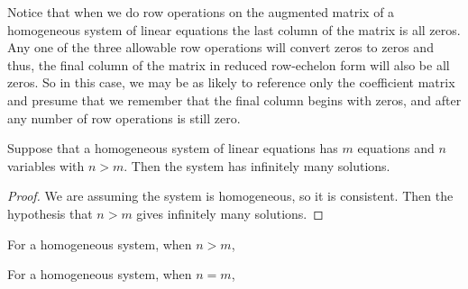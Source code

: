 \documentclass{ximera}
\begin{document}
Notice that when we do row operations on the augmented matrix of a
homogeneous system of linear equations the last column of the matrix
is all zeros.  Any one of the three allowable row operations will
convert zeros to zeros and thus, the final column of the matrix in
reduced row-echelon form will also be all zeros.  So in this case, we
may be as likely to reference only the coefficient matrix and presume
that we remember that the final column begins with zeros, and after
any number of row operations is still zero.

\begin{theorem}
  \label{theorem:HMVEI}
  Suppose that a homogeneous system of linear equations has $m$
  equations and $n$ variables with $n>m$.  Then the system has
  infinitely many solutions.
  
  \begin{proof}
    We are assuming the system is homogeneous, so it is consistent.  Then the hypothesis that $n>m$ gives infinitely many solutions.
  \end{proof}
\end{theorem}

\begin{question}
  For a homogeneous system, when $n>m$,
  \begin{multipleChoice}
  \end{multipleChoice}
  
  \begin{question}
    For a homogeneous system, when $n=m$,
    \begin{multipleChoice}
    \end{multipleChoice}
  \end{question}
  
\end{question}
\end{document}
